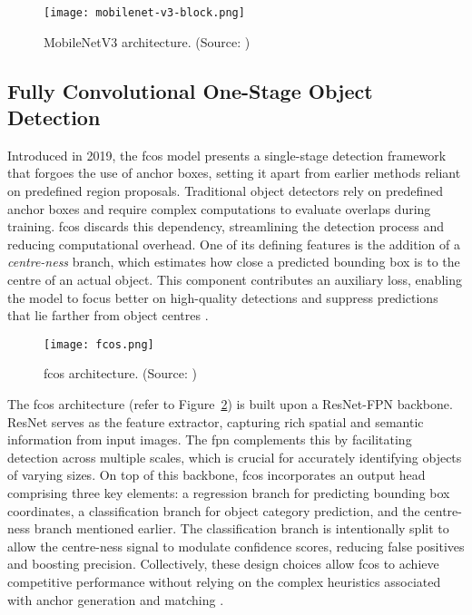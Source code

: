 \begin{figure}[!htbp]
    \centering
    \texttt{[image: mobilenet-v3-block.png]}
    \caption{MobileNetV3 architecture. (Source: \cite{mobilenetv3})}
    \label{fig:ssdlite2}
\end{figure}

\subsection{Fully Convolutional One-Stage Object Detection}
\label{subsec:4_fcos}

Introduced in 2019, the \gls{fcos} model \cite{fcos} presents a single-stage detection framework that forgoes the use of anchor boxes, setting it apart from earlier methods reliant on predefined region proposals. Traditional object detectors rely on predefined anchor boxes and require complex computations to evaluate overlaps during training. \gls{fcos} discards this dependency, streamlining the detection process and reducing computational overhead. One of its defining features is the addition of a \textit{centre-ness} branch, which estimates how close a predicted bounding box is to the centre of an actual object. This component contributes an auxiliary loss, enabling the model to focus better on high-quality detections and suppress predictions that lie farther from object centres \cite{fcos}.

\begin{figure}[!htbp]
    \centering
    \texttt{[image: fcos.png]}
    \caption{\gls{fcos} architecture. (Source: \cite{fcos})}
    \label{fig:fcos}
\end{figure}

The \gls{fcos} architecture (refer to Figure~\ref{fig:fcos}) is built upon a ResNet-FPN backbone. ResNet serves as the feature extractor, capturing rich spatial and semantic information from input images. The \gls{fpn} complements this by facilitating detection across multiple scales, which is crucial for accurately identifying objects of varying sizes. On top of this backbone, \gls{fcos} incorporates an output head comprising three key elements: a regression branch for predicting bounding box coordinates, a classification branch for object category prediction, and the centre-ness branch mentioned earlier. The classification branch is intentionally split to allow the centre-ness signal to modulate confidence scores, reducing false positives and boosting precision. Collectively, these design choices allow \gls{fcos} to achieve competitive performance without relying on the complex heuristics associated with anchor generation and matching \cite{fcos}. 

